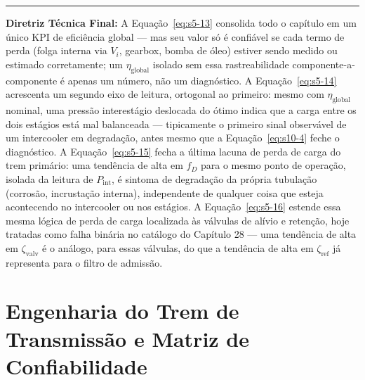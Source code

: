 \documentclass[12pt,a4paper]{article}
\numberwithin{equation}{section}
\numberwithin{table}{section}
\numberwithin{figure}{section}
\begin{document}
	\vspace{1em}
	\hrule
	\vspace{1em}

	\textbf{Diretriz Técnica Final:} A Equação~\eqref{eq:s5-13} consolida todo o capítulo em um único KPI de eficiência global — mas seu valor só é confiável se cada termo de perda (folga interna via $V_i$, gearbox, bomba de óleo) estiver sendo medido ou estimado corretamente; um $\eta_{\text{global}}$ isolado sem essa rastreabilidade componente-a-componente é apenas um número, não um diagnóstico. A Equação~\eqref{eq:s5-14} acrescenta um segundo eixo de leitura, ortogonal ao primeiro: mesmo com $\eta_{\text{global}}$ nominal, uma pressão interestágio deslocada do ótimo indica que a carga entre os dois estágios está mal balanceada — tipicamente o primeiro sinal observável de um intercooler em degradação, antes mesmo que a Equação~\eqref{eq:s10-4} feche o diagnóstico. A Equação~\eqref{eq:s5-15} fecha a última lacuna de perda de carga do trem primário: uma tendência de alta em $f_D$ para o mesmo ponto de operação, isolada da leitura de $P_{\text{int}}$, é sintoma de degradação da própria tubulação (corrosão, incrustação interna), independente de qualquer coisa que esteja acontecendo no intercooler ou nos estágios. A Equação~\eqref{eq:s5-16} estende essa mesma lógica de perda de carga localizada às válvulas de alívio e retenção, hoje tratadas como falha binária no catálogo do Capítulo 28 — uma tendência de alta em $\zeta_{\text{valv}}$ é o análogo, para essas válvulas, do que a tendência de alta em $\zeta_{\text{ref}}$ já representa para o filtro de admissão.

	
	
	\clearpage
	\section{\textbf{Engenharia do Trem de Transmissão e Matriz de Confiabilidade}}

\end{document}
